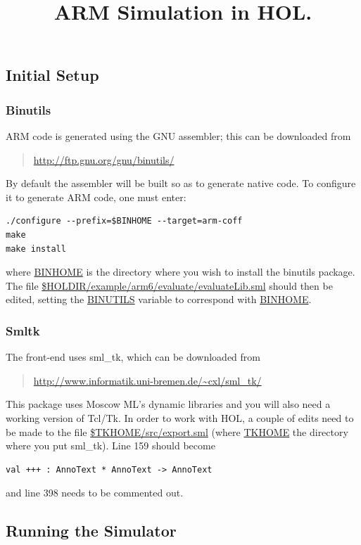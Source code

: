 \documentclass[12pt]{article}
\title{ARM Simulation in HOL.}
\author{}
\date{}
\begin{document}
\maketitle

\subsection*{Initial Setup}

\subsubsection*{Binutils}

ARM code is generated using the GNU assembler; this can be downloaded from
\begin{quote}
\url{http://ftp.gnu.org/gnu/binutils/}
\end{quote}
By default the assembler will be built so as to generate native code.  To configure it to generate ARM code, one must enter:
\begin{Verbatim}
./configure --prefix=$BINHOME --target=arm-coff
make
make install
\end{Verbatim}
where \url{BINHOME} is the directory where you wish to install the \textsf{binutils} package.
The file \url{$HOLDIR/example/arm6/evaluate/evaluateLib.sml} should then be edited, setting the  \url{BINUTILS} variable to correspond with \url{BINHOME}.

\subsubsection*{Smltk}

The front-end uses \textsf{sml_tk}, which can be downloaded from
\begin{quote}
\url{http://www.informatik.uni-bremen.de/~cxl/sml_tk/}
\end{quote}
This package uses Moscow ML's dynamic libraries and you will also need a working version of Tcl/Tk.  In order to work with HOL, a couple of edits need to be made to the file \url{$TKHOME/src/export.sml} (where \url{TKHOME} the directory where you put \textsf{sml_tk}).  Line 159 should become
\begin{Verbatim}
val +++ : AnnoText * AnnoText -> AnnoText
\end{Verbatim}
and line 398 needs to be commented out.

\subsection*{Running the Simulator}
\end{document}
